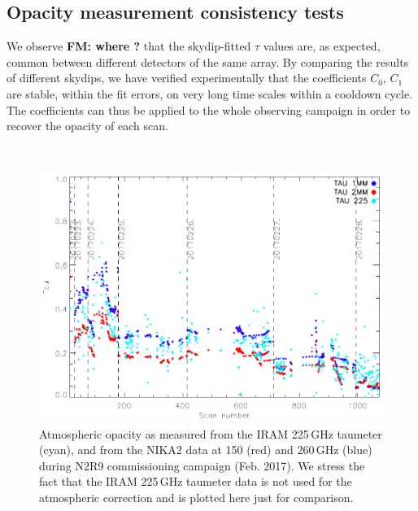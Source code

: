 \subsection{Opacity measurement consistency tests}


We observe {\bf FM: where ?} that the skydip-fitted $\tau$ values are, as expected,
common between different detectors of the same array. By comparing
the results of different skydips, we have verified experimentally
that the coefficients $C_0$, $C_1$ are stable, within the fit
errors, on very long time scales within a cooldown cycle. The
coefficients can thus be applied to the whole observing campaign
in order to recover the opacity of each scan.


\\


\begin{figure}[ht]
\begin{center}
\includegraphics[scale=0.8]{../../Paper_NIKA2_Technical/opacity_evol_run22.pdf}
\caption{Atmospheric opacity as measured from the IRAM 225\,GHz taumeter (cyan), and from the NIKA2 data at 150 (red) and 260\,GHz (blue) during 
  N2R9 commissioning campaign (Feb. 2017). We stress the fact that the IRAM 225\,GHz taumeter data is not used for the atmospheric correction and is plotted here just for comparison.
  \label{fig:taumeas_paper}}
\end{center}
\end{figure}


